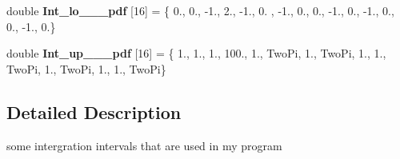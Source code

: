 \begin{DoxyCompactItemize}
\item 
\hypertarget{namespaceIntLimits_a8f5f2b2d899990f9914564f8b4d37e1b}{double {\bfseries Int\-\_\-lo\-\_\-\_\-\_\-pdf} \mbox{[}16\mbox{]} = \{ 0., 0., -\/1., 2., -\/1., 0. , -\/1., 0., 0., -\/1., 0., -\/1., 0., 0., -\/1., 0.\}}\label{namespaceIntLimits_a8f5f2b2d899990f9914564f8b4d37e1b}

\item 
\hypertarget{namespaceIntLimits_a5e31e056fef4f98dcdd589c1d604fa86}{double {\bfseries Int\-\_\-up\-\_\-\_\-\_\-pdf} \mbox{[}16\mbox{]} = \{ 1., 1., 1., 100., 1., Two\-Pi, 1., Two\-Pi, 1., 1., Two\-Pi, 1., Two\-Pi, 1., 1., Two\-Pi\}}\label{namespaceIntLimits_a5e31e056fef4f98dcdd589c1d604fa86}

\end{DoxyCompactItemize}


\subsection{Detailed Description}
some intergration intervals that are used in my program 